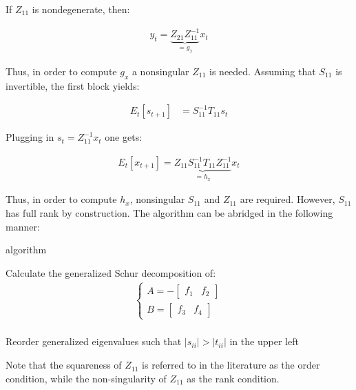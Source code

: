 \documentclass{pracamgr}
\numberwithin{equation}{section}
\begin{document}
If $Z_{11}$ is nondegenerate, then:

\begin{align}
  y_t = \underbrace{Z_{21} Z_{11}^{-1}}_{=g_x} x_t
\end{align}

Thus, in order to compute $g_x$ a nonsingular $Z_{11}$ is needed. Assuming  that $S_{11}$ is invertible, the first block yields:

\begin{align}
   E_t[s_{t+1}] &= S_{11}^{-1} T_{11} s_t
\end{align}

Plugging in $s_t = Z_{11}^{-1} x_t$ one gets:

\begin{align}
   E_t[ x_{t+1}] = \underbrace{Z_{11} S_{11}^{-1} T_{11} Z_{11}^{-1}}_{=h_x} x_t
\end{align}

Thus, in order to compute $h_x$, nonsingular $S_{11}$ and $Z_{11}$ are required. However, $S_{11}$ has full rank by construction. The \citet{klein2000using} algorithm can be abridged in the following manner: \\

\begin{algorithm}[H]
\caption{\citet{klein2000using} algorithm}
Calculate the generalized Schur decomposition of: \\
\qquad \begin{align*} \begin{cases}
A=-\begin{bmatrix} f_1 & f_2\end{bmatrix} \\
B=\begin{bmatrix} f_3 & f_4\end{bmatrix}
\end{cases} \end{align*} \\
Reorder generalized eigenvalues such that $|s_{ii}|>|t_{ii}|$ in the upper left\;
\end{algorithm}

\bigbreak

Note that the squareness of $Z_{11}$ is referred to in the literature as the \citet{blanchard1980solution} order condition, while the non-singularity of $Z_{11}$ as the \citet{blanchard1980solution} rank condition.
\end{document}
